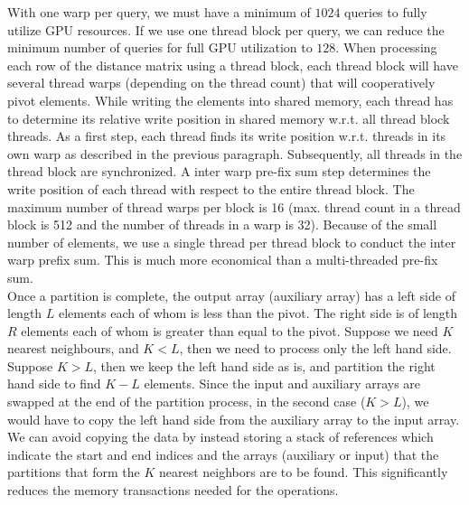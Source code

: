 \documentclass[10pt]{article}
\begin{document}
With one warp per query, we must have a minimum of $1024$ queries to fully utilize GPU resources. If we use one thread block per query, we can reduce the minimum number of queries for full GPU utilization to $128$. When processing each row of the distance matrix using a thread block, each thread block will have several thread warps (depending on the thread count) that will cooperatively pivot elements. While writing the elements into shared memory, each thread has to determine its relative write position in shared memory w.r.t. all thread block threads. As a first step, each thread finds its write position w.r.t. threads in its own warp as described in the previous paragraph. Subsequently,  all threads in the thread block are synchronized. A inter warp pre-fix sum step determines the write position of each thread with respect to the entire thread block. The maximum number of thread warps per block is 16 (max. thread count in a thread block is 512 and the number of threads in a warp is 32). Because of the small number of elements, we use a single thread per thread block to conduct the inter warp prefix sum. This is much more economical than a multi-threaded pre-fix sum. \\

Once a partition is complete, the output array (auxiliary array) has a left side of length $L$ elements each of whom is less than the pivot. The right side is of length $R$ elements each of whom is greater than equal to the pivot. Suppose we need $K$ nearest neighbours, and $K<L$, then we need to process only the left hand side. Suppose $K>L$, then we keep the left hand side as is, and partition the right hand side to find $K-L$ elements. Since the input and auxiliary arrays are swapped at the end of the partition process, in the second case ($K>L$), we would have to copy the left hand side from the auxiliary array to the input array. We can avoid copying the data by instead storing a stack of references which indicate the start and end indices and the arrays (auxiliary or input) that the partitions that form the $K$ nearest neighbors are to be found. This significantly reduces the memory transactions needed for the operations.\\
\end{document}
